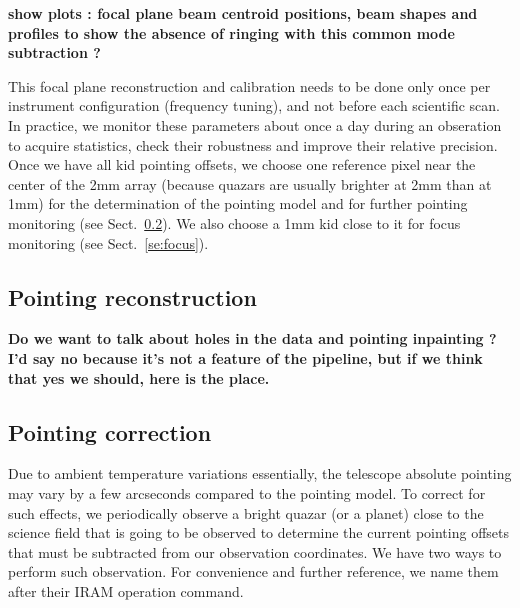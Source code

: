 {\bf show plots : focal plane beam centroid positions, beam shapes and profiles
  to show the absence of ringing with this common mode subtraction ?}

This focal plane reconstruction and calibration needs to be done only once per
instrument configuration (frequency tuning), and not before each scientific
scan. In practice, we monitor these parameters about once a day during an
obseration to acquire statistics, check their robustness and improve their
relative precision. Once we have all kid pointing offsets, we choose one
reference pixel near the center of the 2mm array (because quazars are usually
brighter at 2mm than at 1mm) for the determination of the pointing model and for
further pointing monitoring (see Sect.~\ref{se:pointing_cross}). We also choose
a 1mm kid close to it for focus monitoring (see Sect.~\ref{se:focus}).


\subsection{Pointing reconstruction}

{\bf Do we want to talk about holes in the data and pointing inpainting ? I'd
  say no because it's not a feature of the pipeline, but if we think that yes we
  should, here is the place.}

\subsection{Pointing correction}
\label{se:pointing_cross}

Due to ambient temperature variations essentially, the telescope absolute
pointing may vary by a few arcseconds compared to the pointing model. To correct
for such effects, we periodically observe a bright quazar (or a planet) close to
the science field that is going to be observed to determine the current pointing
offsets that must be subtracted from our observation coordinates. We have two
ways to perform such observation. For convenience and further reference, we name
them after their IRAM operation command.

